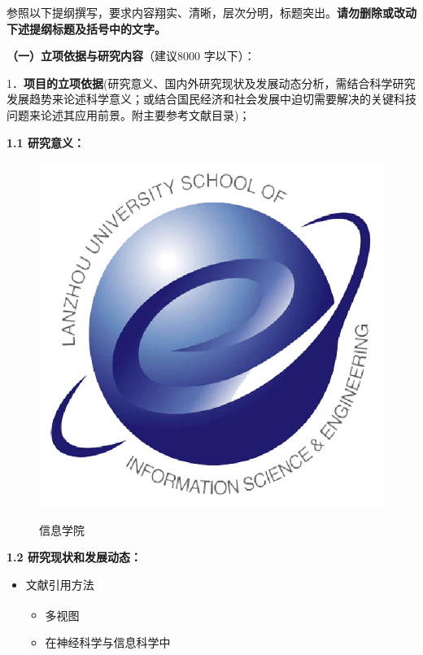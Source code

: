 \documentclass[UTF8,A4]{ctexart}
\newcommand{\upcite}[1]{\textsuperscript{\cite{#1}}}
\newcommand{\blue}{\textcolor[rgb]{0.00,0.44,0.75}}
\begin{document}
\pagestyle{empty}
\begin{center}
\end{center}
\begin{spacing}{1.6}
\kaishu
参照以下提纲撰写，要求内容翔实、清晰，层次分明，标题突出。\blue{\textbf{请勿删除或改动下述提纲标题及括号中的文字。}}

\blue{\textbf{（一）立项依据与研究内容}（建议8000 字以下）：}

\blue{1．\textbf{项目的立项依据}(研究意义、国内外研究现状及发展动态分析，需结合科学研究发展趋势来论述科学意义；或结合国民经济和社会发展中迫切需要解决的关键科技问题来论述其应用前景。附主要参考文献目录)；}
\end{spacing}


\noindent\textbf{1.1 研究意义：}
\begin{figure}
\centering
\includegraphics[width=1\textwidth]{./images/ise.png}\\
\caption{信息学院}
\end{figure}



\noindent\textbf{1.2 研究现状和发展动态：}

\begin{itemize}
  \item 文献引用方法
  \begin{itemize}
\item 多视图\upcite{Zhan8052206}
\item 在神经科学与信息科学中\cite{Zhan8052206}
  \end{itemize}
\end{itemize}
\end{document}
